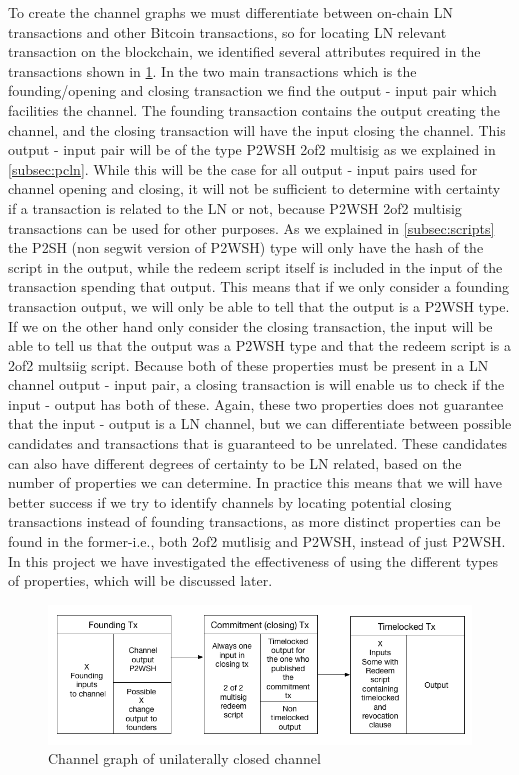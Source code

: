To create the channel graphs we must differentiate between on-chain LN transactions and other Bitcoin transactions,
so for locating LN relevant transaction on the blockchain, we identified several attributes required in the transactions shown in \cref{fig:ln_tx_graph}. 
In the two main transactions which is the founding/opening and closing transaction we find the output - input pair which facilities the channel. The founding transaction contains the output creating the channel, and the closing transaction will have the input closing the channel. This output - input pair will be of the type P2WSH 2of2 multisig as we explained in \cref{subsec:pcln}. 
While this will be the case for all output - input pairs used for channel opening and closing, it will not be sufficient to determine with certainty if a transaction is related to the LN or not, because P2WSH 2of2 multisig transactions can be used for other purposes. As we explained in \cref{subsec:scripts} the P2SH (non segwit version of P2WSH) type will only have the hash of the script in the output, while the redeem script itself is included in the input of the transaction spending that output. This means that if we only consider a founding transaction output, we will only be able to tell that the output is a P2WSH type. If we on the other hand only consider the closing transaction, the input will be able to tell us that the output was a P2WSH type and that the redeem script is a 2of2 multsiig script.
Because both of these properties must be present in a LN channel output - input pair, a closing transaction is will enable us to check if the input - output has both of these. Again, these two properties does not guarantee that the input - output is a LN channel, but we can differentiate between possible candidates and transactions that is guaranteed to be unrelated. These candidates can also have different degrees of certainty to be LN related, based on the number of properties we can determine. In practice this means that we will have better success if we try to identify channels by locating potential closing transactions instead of founding transactions, as more distinct properties can be found in the former-i.e., both 2of2 mutlisig and P2WSH, instead of just P2WSH. In this project we have investigated the effectiveness of using the different types of properties, which will be discussed later.
\\

\begin{figure}[h]
    \centering
    \includegraphics[width=15cm]{figures/chan_graph.png}
    \caption{Channel graph of unilaterally closed channel}
    \label{fig:ln_tx_graph}
\end{figure}


